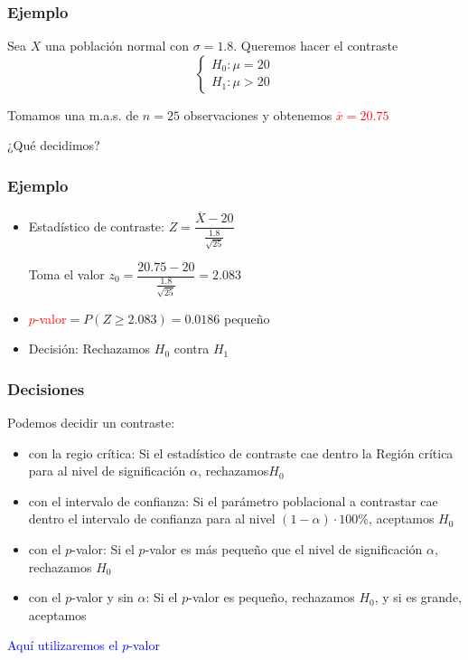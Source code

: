 \documentclass[12pt,t]{beamer}\usepackage[]{graphicx}\usepackage[]{color}
\newcommand{\red}[1]{\textcolor{red}{#1}}
\newcommand{\blue}[1]{\textcolor{blue}{#1}}
\renewcommand{\emph}[1]{{\color{red}#1}}
\renewcommand{\geq}{\geqslant}
\theoremstyle{plain}
\theoremstyle{definition}
\begin{document}
\begin{frame}
\frametitle{Ejemplo}
Sea $X$ una población normal con $\sigma=1.8$. Queremos hacer el contraste
$$
\left\{\begin{array}{l}
H_{0}:\mu=20\\ H_{1}:\mu>20
\end{array}
\right.
$$
\medskip

Tomamos una m.a.s. de $n=25$ observaciones y obtenemos  \red{$\overline{x}=20.75$}
\medskip

¿Qué decidimos?

\end{frame}


\begin{frame}
\frametitle{Ejemplo}

\begin{itemize}
\item \emph{Estadístico de contraste}: $Z=
\dfrac{\overline{X}-20}{\frac{1.8}{\sqrt{25}}}$
\medskip

Toma el valor $z_0=\dfrac{20.75-20}{\frac{1.8}{\sqrt{25}}}=2.083$

\item \red{$p$-valor}$=P(Z\geq 2.083)=0.0186$  pequeño

\item \emph{Decisión}:
Rechazamos $H_{0}$ contra $H_1$
\end{itemize}

\end{frame}


\begin{frame}
\frametitle{Decisiones}

Podemos decidir un contraste:
\begin{itemize}
\item \emph{con la regio crítica:} Si el estadístico de contraste    cae dentro la Región crítica para al nivel   de significación   $\alpha$, rechazamos$H_0$
\medskip

\item \emph{con el intervalo de confianza:} Si el parámetro poblacional a contrastar cae dentro el intervalo de confianza para al nivel   $(1-\alpha)\cdot 100\%$, aceptamos $H_0$
\medskip

\item \emph{con el $p$-valor:} Si el $p$-valor es más pequeño que el nivel   de significación   $\alpha$, rechazamos $H_0$
\medskip

\item \emph{con el $p$-valor y sin $\alpha$:} Si el $p$-valor es pequeño, rechazamos $H_0$, y si es grande,  aceptamos
\end{itemize}
\medskip

\blue{Aquí utilizaremos el $p$-valor}
\end{frame}
\end{document}
